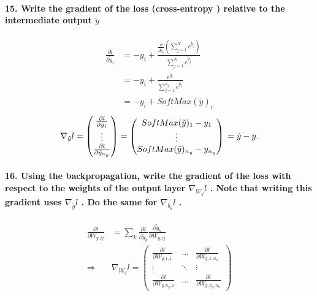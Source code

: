 \documentclass{article}
\theoremstyle{plain}%
\theoremstyle{definition}
\theoremstyle{remark}
\begin{document}
\paragraph{15. Write the gradient of the loss (cross-entropy ) relative to the intermediate output $ \tilde{y} $ }
\begin{align*}
    \frac{\partial l}{\partial \tilde{y}_i} &= -y_i + \frac{\frac{\partial }{\partial \tilde{y}_i } (\sum_{j=1}^{N} e^{ \tilde{y}_j })}{\sum_{j=1}^{N} e^{ \tilde{y}_j }} \\
        &= - y_i + \frac{e^{\tilde{y}_i}}{\sum_{j=1}^{n_y} e^{ \tilde{y}_j}} \\
        &= - y_i + SoftMax(\tilde{y})_i
\end{align*}
\[
    \nabla _{\tilde{y}}l = \begin{pmatrix}
        \frac{\partial l}{\partial \tilde{y}_1} \\
        \vdots \\
        \frac{\partial l}{\partial \tilde{y}_{n_y}}
    \end{pmatrix} = \begin{pmatrix}
        SoftMax(\tilde{y})_1 - y_1 \\
        \vdots \\
        SoftMax(\tilde{y})_{n_y} - y_{n_y}
    \end{pmatrix} \\
    = \hat{y} - y
.\]


\paragraph{16. Using the backpropagation, write the gradient of the loss with respect to the weights of the output layer $ \nabla _{W_y}l $ . Note that writing this gradient uses $ \nabla _{\tilde{y}}l $ . Do the same for $ \nabla _{b_y}l $ .}

\begin{align*}
    \frac{\partial l}{\partial W_{y,ij}} &= \sum_{k}^{} \frac{\partial l}{\partial \tilde{y}_k} \frac{\partial \tilde{y}_k}{\partial W_{y,ij}} \\
    \Rightarrow & \nabla_{W_y} l = \begin{pmatrix}
        \frac{\partial l}{\partial W_{y, 1,1}} & \dots & \frac{\partial l}{\partial W_{y, 1,n_h}}\\
        \vdots & \ddots & \vdots \\
        \frac{\partial l}{\partial W_{y, n_y,1}} & \dots & \frac{\partial l}{\partial W_{y, n_y, n_h}}
    \end{pmatrix}
\end{align*}
\end{document}
